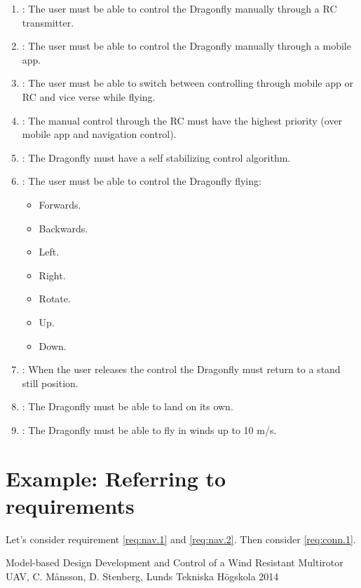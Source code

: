 \documentclass[a4paper]{article}
\makeatletter
\newcommand{\labitem}[2]{%
\def\@itemlabel{\textbf{#2}}
\item
\def\@currentlabel{#2}\label{#1}}
\makeatother
\begin{document}
\begin{enumerate}
\labitem{req:cf.1}{Control Flight.1}: The user must be able to control the Dragonfly manually through a RC transmitter.
\labitem{req:cf.2}{Control Flight.2}: The user must be able to control the Dragonfly manually through a mobile app.
\labitem{req:cf.3}{Control Flight.3}: The user must be able to switch between controlling through mobile app or RC and vice verse while flying.
\labitem{req:cf.4}{Control Flight.4}: The manual control through the RC must have the highest priority (over mobile app and navigation control).
\labitem{req:cf.5}{Control Flight.5}: The Dragonfly must have a self stabilizing control algorithm.
\labitem{req:cf.6}{Control Flight.6}: The user must be able to control the Dragonfly flying:
\begin{itemize}
\item Forwards.
\item Backwards.
\item Left.
\item Right.
\item Rotate.
\item Up.
\item Down.
\end{itemize}
\labitem{req:cf.7}{Control Flight.7}: When the user releases the control the Dragonfly must return to a stand still position.
\labitem{req:cf.8}{Control Flight.8}: The Dragonfly must be able to land on its own.
\labitem{req:cf.9}{Control Flight.9}: The Dragonfly must be able to fly in winds up to 10 m/s.
\end{enumerate}

\section{Example: Referring to requirements}
Let's consider requirement \ref{req:nav.1} and \ref{req:nav.2}. Then consider \ref{req:conn.1}.


\begin{thebibliography}{99}
 Model-based Design Development and Control of a Wind Resistant Multirotor UAV, C. Månsson, D. Stenberg, Lunds Tekniska Högskola 2014
\end{thebibliography}
\end{document}
